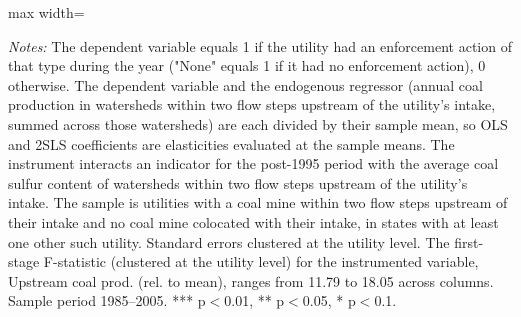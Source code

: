 \begin{table}[htbp]
{\begin{adjustbox}{max width=\linewidth}
\begin{tabular}
\bottomrule
\end{tabular}
\end{adjustbox}
}
\begin{minipage}{\linewidth}
\vspace{4pt}
\footnotesize
\raggedright
\textit{Notes:} The dependent variable equals 1 if the utility had an enforcement action of that type during the year ("None" equals 1 if it had no enforcement action), 0 otherwise. The dependent variable and the endogenous regressor (annual coal production in watersheds within two flow steps upstream of the utility's intake, summed across those watersheds) are each divided by their sample mean, so OLS and 2SLS coefficients are elasticities evaluated at the sample means. The instrument interacts an indicator for the post-1995 period with the average coal sulfur content of watersheds within two flow steps upstream of the utility's intake. The sample is utilities with a coal mine within two flow steps upstream of their intake and no coal mine colocated with their intake, in states with at least one other such utility. Standard errors clustered at the utility level. The first-stage F-statistic (clustered at the utility level) for the instrumented variable, Upstream coal prod. (rel. to mean), ranges from 11.79 to 18.05 across columns. Sample period 1985--2005. *** p$<$0.01, ** p$<$0.05, * p$<$0.1.
\end{minipage}
\end{table}

